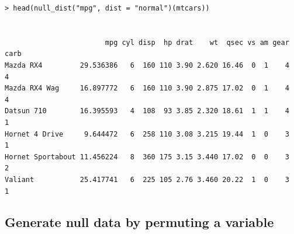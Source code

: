 \documentclass[article]{jss}
\begin{document}
\begin{verbatim}
> head(null_dist("mpg", dist = "normal")(mtcars))


                        mpg cyl disp  hp drat    wt  qsec vs am gear carb
Mazda RX4         29.536386   6  160 110 3.90 2.620 16.46  0  1    4    4
Mazda RX4 Wag     16.897772   6  160 110 3.90 2.875 17.02  0  1    4    4
Datsun 710        16.395593   4  108  93 3.85 2.320 18.61  1  1    4    1
Hornet 4 Drive     9.644472   6  258 110 3.08 3.215 19.44  1  0    3    1
Hornet Sportabout 11.456224   8  360 175 3.15 3.440 17.02  0  0    3    2
Valiant           25.417741   6  225 105 2.76 3.460 20.22  1  0    3    1
\end{verbatim}


\subsection{Generate null data by permuting a
variable}\label{generate-null-data-by-permuting-a-variable}
\end{document}
